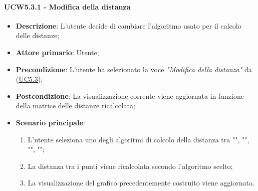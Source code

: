 \paragraph{UCW5.3.1 - Modifica della distanza}
\label{par:ucw5.3.1}
\begin{itemize}
    \item \textbf{Descrizione}: L’utente decide di cambiare l’algoritmo usato per il calcolo delle distanze;

    \item \textbf{Attore primario}: Utente;

    \item \textbf{Precondizione}:   L'utente ha selezionato la voce \emph{"Modifica della distanza"} da (\hyperref[ssub:uc5.3]{UC5.3});
    \item \textbf{Postcondizione}:  La visualizzazione corrente viene aggiornata in funzione della matrice delle distanze ricalcolata;

	\item \textbf{Scenario principale}:
        \begin{enumerate}
            \item L'utente seleziona uno degli algoritmi di calcolo della distanza tra "", 
            "", "", "";
            \item La distanza tra i punti viene ricalcolata secondo l'algoritmo scelto;
            \item La visualizzazione del grafico precedentemente costruito viene aggiornata.
        \end{enumerate}
\end{itemize}

